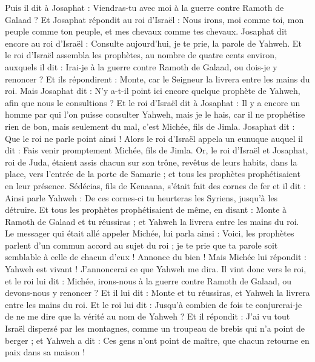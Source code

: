 \begin{multicols}{2}
Puis il dit à Josaphat : Viendras-tu avec moi à la guerre contre Ramoth de Galaad ? Et Josaphat répondit au roi d'Israël : Nous irons, moi comme toi, mon peuple comme ton peuple, et mes chevaux comme tes chevaux.
Josaphat dit encore au roi d'Israël : Consulte aujourd'hui, je te prie, la parole de Yahweh.
Et le roi d'Israël assembla les prophètes, au nombre de quatre cents environ, auxquels il dit : Irai-je à la guerre contre Ramoth de Galaad, ou dois-je y renoncer ? Et ils répondirent : Monte, car le Seigneur la livrera entre les mains du roi.
Mais Josaphat dit : N'y a-t-il point ici encore quelque prophète de Yahweh, afin que nous le consultions ?
Et le roi d'Israël dit à Josaphat : Il y a encore un homme par qui l’on puisse consulter Yahweh, mais je le hais, car il ne prophétise rien de bon, mais seulement du mal, c'est Michée, fils de Jimla. Josaphat dit : Que le roi ne parle point ainsi !
Alors le roi d'Israël appela un eunuque auquel il dit : Fais venir promptement Michée, fils de Jimla.
Or, le roi d'Israël et Josaphat, roi de Juda, étaient assis chacun sur son trône, revêtus de leurs habits, dans la place, vers l'entrée de la porte de Samarie ; et tous les prophètes prophétisaient en leur présence.
Sédécias, fils de Kenaana, s'était fait des cornes de fer et il dit : Ainsi parle Yahweh : De ces cornes-ci tu heurteras les Syriens, jusqu'à les détruire.
Et tous les prophètes prophétisaient de même, en disant : Monte à Ramoth de Galaad et tu réussiras ; et Yahweh la livrera entre les mains du roi.
Le messager qui était allé appeler Michée, lui parla ainsi : Voici, les prophètes parlent d'un commun accord au sujet du roi ; je te prie que ta parole soit semblable à celle de chacun d’eux ! Annonce du bien !
Mais Michée lui répondit : Yahweh est vivant ! J’annoncerai ce que Yahweh me dira.
Il vint donc vers le roi, et le roi lui dit : Michée, irons-nous à la guerre contre Ramoth de Galaad, ou devons-nous y renoncer ? Et il lui dit : Monte et tu réussiras, et Yahweh la livrera entre les mains du roi.
Et le roi lui dit : Jusqu'à combien de fois te conjurerai-je de ne me dire que la vérité au nom de Yahweh ?
Et il répondit : J'ai vu tout Israël dispersé par les montagnes, comme un troupeau de brebis qui n'a point de berger ; et Yahweh a dit : Ces gens n’ont point de maître, que chacun retourne en paix dans sa maison !

\end{multicols}
